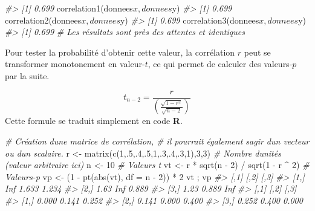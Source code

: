 \documentclass[
]{book}
\newenvironment{Shaded}{}{}
\newcommand{\AttributeTok}[1]{#1}
\newcommand{\CommentTok}[1]{\textit{#1}}
\newcommand{\DecValTok}[1]{#1}
\newcommand{\FunctionTok}[1]{#1}
\newcommand{\NormalTok}[1]{#1}
\newcommand{\OtherTok}[1]{#1}
\newcommand{\SpecialCharTok}[1]{#1}
\begin{document}
\begin{Shaded}
\begin{Highlighting}[]
\CommentTok{\#\textgreater{} [1] 0.699}
\FunctionTok{correlation1}\NormalTok{(donnees}\SpecialCharTok{$}\NormalTok{x, donnees}\SpecialCharTok{$}\NormalTok{y)}
\CommentTok{\#\textgreater{} [1] 0.699}
\FunctionTok{correlation2}\NormalTok{(donnees}\SpecialCharTok{$}\NormalTok{x, donnees}\SpecialCharTok{$}\NormalTok{y)}
\CommentTok{\#\textgreater{} [1] 0.699}
\FunctionTok{correlation3}\NormalTok{(donnees}\SpecialCharTok{$}\NormalTok{x, donnees}\SpecialCharTok{$}\NormalTok{y)}
\CommentTok{\#\textgreater{} [1] 0.699}
\CommentTok{\# Les résultats sont près des attentes et identiques}
\end{Highlighting}
\end{Shaded}

Pour tester la probabilité d'obtenir cette valeur, la corrélation \(r\) peut se transformer monotonement en valeur-\(t\), ce qui permet de calculer des valeurs-\(p\) par la suite.

\[ t_{n-2} = \frac{r}{(\frac{\sqrt{1-r^2}}{\sqrt{n-2}})} \]
Cette formule se traduit simplement en code \textbf{R}.

\begin{Shaded}
\begin{Highlighting}[]
\CommentTok{\# Création d\textquotesingle{}une matrice de corrélation, }
\CommentTok{\# il pourrait également s\textquotesingle{}agir d\textquotesingle{}un vecteur ou d\textquotesingle{}un scalaire.}
\NormalTok{r }\OtherTok{\textless{}{-}} \FunctionTok{matrix}\NormalTok{(}\FunctionTok{c}\NormalTok{(}\DecValTok{1}\NormalTok{,.}\DecValTok{5}\NormalTok{,.}\DecValTok{4}\NormalTok{,.}\DecValTok{5}\NormalTok{,}\DecValTok{1}\NormalTok{,.}\DecValTok{3}\NormalTok{,.}\DecValTok{4}\NormalTok{,.}\DecValTok{3}\NormalTok{,}\DecValTok{1}\NormalTok{),}\DecValTok{3}\NormalTok{,}\DecValTok{3}\NormalTok{)}
\CommentTok{\# Nombre d\textquotesingle{}unités (valeur arbitraire ici)}
\NormalTok{n }\OtherTok{\textless{}{-}} \DecValTok{10}
\CommentTok{\# Valeurs t}
\NormalTok{vt }\OtherTok{\textless{}{-}}\NormalTok{ r }\SpecialCharTok{*} \FunctionTok{sqrt}\NormalTok{(n }\SpecialCharTok{{-}} \DecValTok{2}\NormalTok{) }\SpecialCharTok{/} \FunctionTok{sqrt}\NormalTok{(}\DecValTok{1} \SpecialCharTok{{-}}\NormalTok{ r }\SpecialCharTok{\^{}} \DecValTok{2}\NormalTok{)}
\CommentTok{\# Valeurs{-}p}
\NormalTok{vp }\OtherTok{\textless{}{-}}\NormalTok{ (}\DecValTok{1} \SpecialCharTok{{-}} \FunctionTok{pt}\NormalTok{(}\FunctionTok{abs}\NormalTok{(vt), }\AttributeTok{df =}\NormalTok{ n }\SpecialCharTok{{-}} \DecValTok{2}\NormalTok{)) }\SpecialCharTok{*} \DecValTok{2}
\NormalTok{vt ; vp}
\CommentTok{\#\textgreater{}      [,1]  [,2]  [,3]}
\CommentTok{\#\textgreater{} [1,]  Inf 1.633 1.234}
\CommentTok{\#\textgreater{} [2,] 1.63   Inf 0.889}
\CommentTok{\#\textgreater{} [3,] 1.23 0.889   Inf}
\CommentTok{\#\textgreater{}       [,1]  [,2]  [,3]}
\CommentTok{\#\textgreater{} [1,] 0.000 0.141 0.252}
\CommentTok{\#\textgreater{} [2,] 0.141 0.000 0.400}
\CommentTok{\#\textgreater{} [3,] 0.252 0.400 0.000}
\end{Highlighting}
\end{Shaded}
\end{document}
